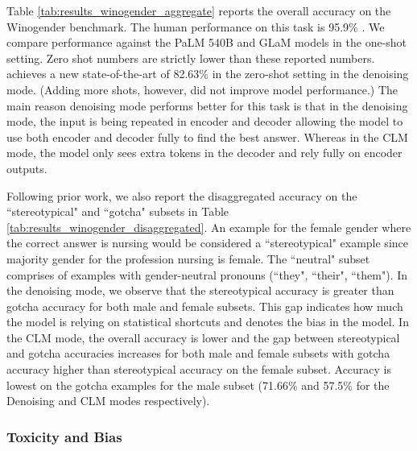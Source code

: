 Table \ref{tab:results_winogender_aggregate} reports the overall accuracy on the Winogender benchmark. The human performance on this task is 95.9\% \citep{rudinger-etal-2018-gender}. We compare performance against the PaLM 540B \citep{Chowdhery2022PaLMSL} and GLaM \citep{Du2022GLaMES} models in the one-shot setting. Zero shot numbers are strictly lower than these reported numbers. \modelname achieves a new state-of-the-art of 82.63\% in the zero-shot setting in the denoising mode. (Adding more shots, however, did not improve model performance.) The main reason denoising mode performs better for this task is that in the denoising mode, the input is being repeated in encoder and decoder allowing the model to use both encoder and decoder fully to find the best answer. Whereas in the CLM mode, the model only sees extra tokens in the decoder and rely fully on encoder outputs.

Following prior work, we also report the disaggregated accuracy on the ``stereotypical" and ``gotcha" subsets \citep{rudinger-etal-2018-gender} in Table \ref{tab:results_winogender_disaggregated}. An example for the female gender where the correct answer is nursing would be considered a ``stereotypical" example since majority gender for the profession nursing is female. The ``neutral" subset comprises of examples with gender-neutral pronouns (``they", ``their", ``them"). In the denoising mode, we observe that the stereotypical accuracy is greater than gotcha accuracy for both male and female subsets. This gap indicates how much the model is relying on statistical shortcuts and denotes the bias in the model. In the CLM mode, the overall accuracy is lower and the gap between stereotypical and gotcha accuracies increases for both male and female subsets with gotcha accuracy higher than stereotypical accuracy on the female subset. Accuracy is lowest on the gotcha examples for the male subset (71.66\% and 57.5\% for the Denoising and CLM modes respectively).


\subsubsection{Toxicity and Bias}

